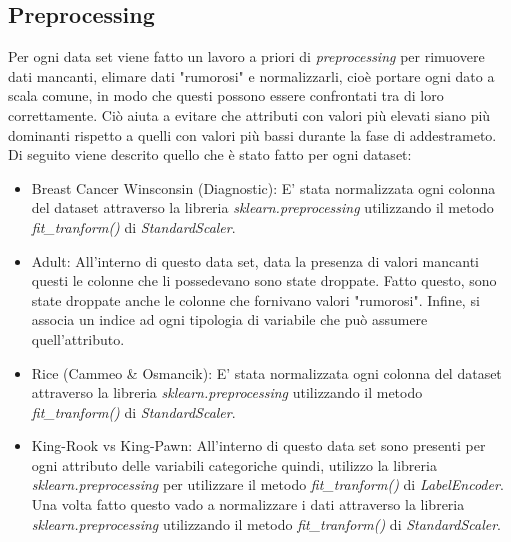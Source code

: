 \documentclass{article}
\begin{document}
	\subsection{Preprocessing}
    Per ogni data set viene fatto un lavoro a priori di \textit{preprocessing} per rimuovere dati mancanti, elimare dati "rumorosi" e normalizzarli, cioè portare ogni dato a scala comune, in modo che questi possono essere confrontati tra di loro correttamente. Ciò aiuta a evitare che attributi con valori più elevati siano più dominanti rispetto a quelli con valori più bassi durante la fase di addestrameto.
	Di seguito viene descrito quello che è stato fatto per ogni dataset:
	\begin{itemize}
		\item Breast Cancer Winsconsin (Diagnostic): E' stata normalizzata ogni colonna del dataset attraverso la libreria \textit{sklearn.preprocessing} utilizzando il metodo \textit{fit\_tranform()} di \textit{StandardScaler}.
		\item Adult: All'interno di questo data set, data la presenza di valori mancanti questi le colonne che li possedevano sono state droppate. Fatto questo, sono state droppate anche le colonne che fornivano valori "rumorosi". Infine, si associa un indice ad ogni tipologia di variabile che può assumere quell'attributo.
		\item Rice (Cammeo \& Osmancik): E' stata normalizzata ogni colonna del dataset attraverso la libreria \textit{sklearn.preprocessing} utilizzando il metodo \textit{fit\_tranform()} di \textit{StandardScaler}.
		\item King-Rook vs King-Pawn: All'interno di questo data set sono presenti per ogni attributo delle variabili categoriche quindi, utilizzo la libreria \textit{sklearn.preprocessing} per utilizzare il metodo \textit{fit\_tranform()} di \textit{LabelEncoder}. Una volta fatto questo vado a normalizzare i dati attraverso la libreria \textit{sklearn.preprocessing} utilizzando il metodo \textit{fit\_tranform()} di \textit{StandardScaler}.
	\end{itemize} 
\end{document}
